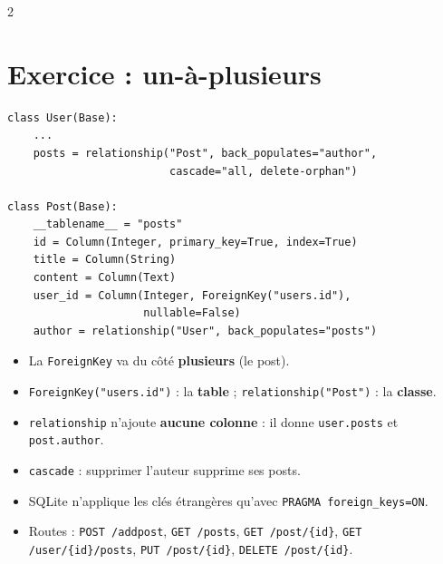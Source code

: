 \documentclass[a4paper,10pt]{article}
\newcommand{\co}[1]{\texttt{\textcolor{codefg}{#1}}}
\begin{document}
\begin{multicols}{2}
\section{Exercice : un-à-plusieurs}

\begin{lstlisting}
class User(Base):
    ...
    posts = relationship("Post", back_populates="author",
                         cascade="all, delete-orphan")

class Post(Base):
    __tablename__ = "posts"
    id = Column(Integer, primary_key=True, index=True)
    title = Column(String)
    content = Column(Text)
    user_id = Column(Integer, ForeignKey("users.id"),
                     nullable=False)
    author = relationship("User", back_populates="posts")
\end{lstlisting}

\begin{itemize}
  \item La \co{ForeignKey} va du côté \textbf{plusieurs} (le post).
  \item \co{ForeignKey("users.id")} : la \textbf{table} ;
        \co{relationship("Post")} : la \textbf{classe}.
  \item \co{relationship} n'ajoute \textbf{aucune colonne} : il donne
        \co{user.posts} et \co{post.author}.
  \item \co{cascade} : supprimer l'auteur supprime ses posts.
  \item SQLite n'applique les clés étrangères qu'avec
        \co{PRAGMA foreign\_keys=ON}.
  \item Routes : \co{POST /addpost}, \co{GET /posts},
        \co{GET /post/\{id\}}, \co{GET /user/\{id\}/posts},
        \co{PUT /post/\{id\}}, \co{DELETE /post/\{id\}}.
\end{itemize}

\end{multicols}
\end{document}

